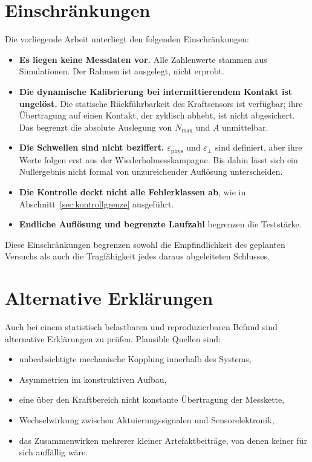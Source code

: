 \documentclass[12pt,a4paper]{report}
\begin{document}
\section{Einschränkungen}

Die vorliegende Arbeit unterliegt den folgenden Einschränkungen:

\begin{itemize}
    \item \textbf{Es liegen keine Messdaten vor.} Alle Zahlenwerte
    stammen aus Simulationen. Der Rahmen ist ausgelegt, nicht erprobt.
    \item \textbf{Die dynamische Kalibrierung bei intermittierendem
    Kontakt ist ungelöst.} Die statische Rückführbarkeit des
    Kraftsensors ist verfügbar; ihre Übertragung auf einen Kontakt, der
    zyklisch abhebt, ist nicht abgesichert. Das begrenzt die absolute
    Auslegung von $N_{\max}$ und $A$ unmittelbar.
    \item \textbf{Die Schwellen sind nicht beziffert.}
    $\varepsilon_{\mathrm{phys}}$ und $\varepsilon_{\perp}$ sind
    definiert, aber ihre Werte folgen erst aus der
    Wiederholmesskampagne. Bis dahin lässt sich ein Nullergebnis nicht
    formal von unzureichender Auflösung unterscheiden.
    \item \textbf{Die Kontrolle deckt nicht alle Fehlerklassen ab}, wie
    in Abschnitt~\ref{sec:kontrollgrenze} ausgeführt.
    \item \textbf{Endliche Auflösung und begrenzte Laufzahl} begrenzen
    die Teststärke.
\end{itemize}

Diese Einschränkungen begrenzen sowohl die Empfindlichkeit des geplanten
Versuchs als auch die Tragfähigkeit jedes daraus abgeleiteten Schlusses.

\section{Alternative Erklärungen}

Auch bei einem statistisch belastbaren und reproduzierbaren Befund sind
alternative Erklärungen zu prüfen. Plausible Quellen sind:

\begin{itemize}
    \item unbeabsichtigte mechanische Kopplung innerhalb des Systems,
    \item Asymmetrien im konstruktiven Aufbau,
    \item eine über den Kraftbereich nicht konstante Übertragung der
    Messkette,
    \item Wechselwirkung zwischen Aktuierungssignalen und
    Sensorelektronik,
    \item das Zusammenwirken mehrerer kleiner Artefaktbeiträge, von denen
    keiner für sich auffällig wäre.
\end{itemize}
\end{document}
